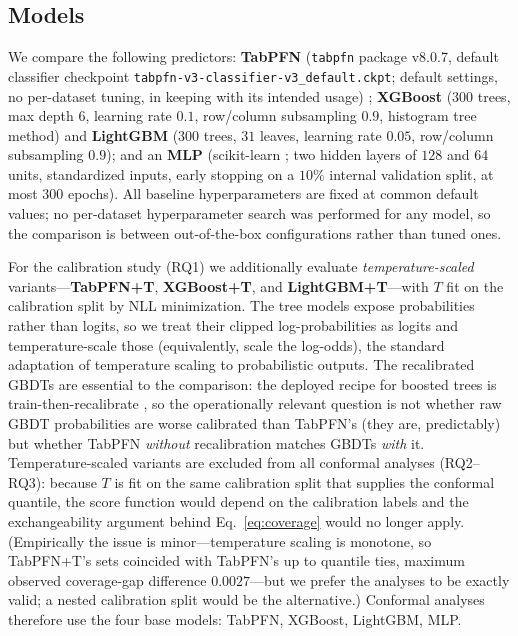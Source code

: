 \documentclass[review,12pt]{elsarticle}
\begin{document}
\subsection{Models}
We compare the following predictors: \textbf{TabPFN} (\texttt{tabpfn} package v8.0.7, default classifier checkpoint \texttt{tabpfn-v3-classifier-v3\_default.ckpt}; default settings, no per-dataset tuning, in keeping with its intended usage) \cite{tabpfn2023,tabpfn2025}; \textbf{XGBoost} \cite{chen2016} ($300$ trees, max depth $6$, learning rate $0.1$, row/column subsampling $0.9$, histogram tree method) and \textbf{LightGBM} \cite{ke2017} ($300$ trees, $31$ leaves, learning rate $0.05$, row/column subsampling $0.9$); and an \textbf{MLP} (scikit-learn \cite{pedregosa2011}; two hidden layers of $128$ and $64$ units, standardized inputs, early stopping on a $10\%$ internal validation split, at most $300$ epochs). All baseline hyperparameters are fixed at common default values; no per-dataset hyperparameter search was performed for any model, so the comparison is between out-of-the-box configurations rather than tuned ones.

For the calibration study (RQ1) we additionally evaluate \emph{temperature-scaled} variants---\textbf{TabPFN+T}, \textbf{XGBoost+T}, and \textbf{LightGBM+T}---with $T$ fit on the calibration split by NLL minimization. The tree models expose probabilities rather than logits, so we treat their clipped log-probabilities as logits and temperature-scale those (equivalently, scale the log-odds), the standard adaptation of temperature scaling to probabilistic outputs. The recalibrated GBDTs are essential to the comparison: the deployed recipe for boosted trees is train-then-recalibrate \cite{niculescu2005,guo2017}, so the operationally relevant question is not whether raw GBDT probabilities are worse calibrated than TabPFN's (they are, predictably) but whether TabPFN \emph{without} recalibration matches GBDTs \emph{with} it. Temperature-scaled variants are excluded from all conformal analyses (RQ2--RQ3): because $T$ is fit on the same calibration split that supplies the conformal quantile, the score function would depend on the calibration labels and the exchangeability argument behind Eq.~\eqref{eq:coverage} would no longer apply. (Empirically the issue is minor---temperature scaling is monotone, so TabPFN+T's sets coincided with TabPFN's up to quantile ties, maximum observed coverage-gap difference $0.0027$---but we prefer the analyses to be exactly valid; a nested calibration split would be the alternative.) Conformal analyses therefore use the four base models: TabPFN, XGBoost, LightGBM, MLP.
\end{document}
